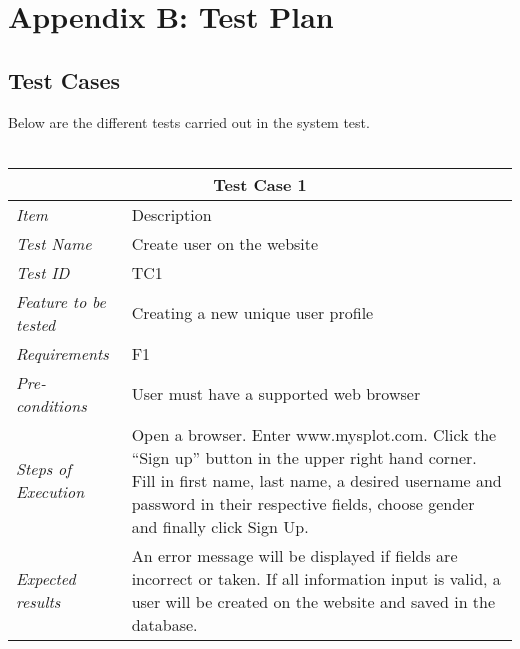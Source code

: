 


\chapter{Appendix B: Test Plan}
\label{chap:TestingTPlan}


\section{Test Cases}
\label{sec:TestCases}

Below are the different tests carried out in the system test. \\ \\
%
\begin{minipage}{\linewidth}
\setlength{\tabcolsep}{15pt}
\centering
{}
\begin{tabular}{ |l|p{70mm}| }
	\hline
	\multicolumn{2}{|c|}{\cellcolor{gray!25} \textbf{Test Case 1}} \\
	\hline
	\it{\cellcolor{gray!25}Item} & {\cellcolor{gray!25} Description } \\
	\hline
	\it{\cellcolor{gray!25}Test Name } & Create user on the website \\ \hline
	\it{\cellcolor{gray!25}Test ID} & TC1 \\ \hline
	\it{\cellcolor{gray!25}Feature to be tested} & Creating a new unique user profile \\ \hline
	\it{\cellcolor{gray!25}Requirements} & F1  \\ \hline
	\it{\cellcolor{gray!25}Pre-conditions} & User must have a supported web browser  \\ \hline
	\it{\cellcolor{gray!25}Steps of Execution} & Open a browser. Enter www.mysplot.com. Click the ``Sign up'' button in the upper right hand corner. Fill in first name, last name, a desired username and password in their respective fields, choose gender and finally click Sign Up. \\ \hline
	\it{\cellcolor{gray!25}Expected results} & An error message will be displayed if fields are incorrect or taken. If all information input is valid, a user will be created on the website and saved in the database.  \\
	\hline
\end{tabular}
\medskip
\end{minipage}
%

